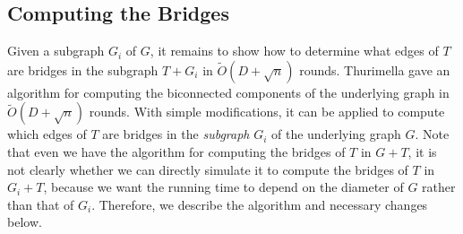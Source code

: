 \documentclass[11pt]{article}
\begin{document}
\subsection{Computing the Bridges}
Given a subgraph $G_i$ of $G$, it remains to show how to determine what edges of $T$ are bridges in the subgraph $T +G_i$ in $\tilde{O}(D+\sqrt{n})$ rounds. Thurimella \cite{Thurimella97} gave an algorithm for computing the biconnected components of the underlying graph in $\tilde{O}(D+\sqrt{n})$ rounds. With simple modifications, it can be applied to compute which edges of $T$ are bridges in the {\it subgraph} $G_i$ of the underlying graph $G$. Note that even we have the algorithm for computing the bridges of $T$ in $G+T$, it is not clearly whether we can directly simulate it to compute the bridges of $T$ in $G_i+T$, because we want the running time to depend on the diameter of $G$ rather than that of $G_i$. Therefore, we describe the algorithm and necessary changes below.
\end{document}
